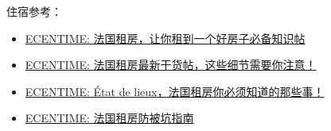 住宿参考：
\begin{itemize}
    \item \href{https://www.ecentime.com/article/location-logement}{ECENTIME: 法国租房，让你租到一个好房子必备知识帖}
    \item \href{https://www.ecentime.com/article/location-en-france}{ECENTIME: 法国租房最新干货帖，这些细节需要你注意！}
    \item \href{https://www.ecentime.com/article/connaissances-sur-etat-des-lieux}{ECENTIME: État de lieux，法国租房你必须知道的那些事！}
    \item \href{https://www.ecentime.com/article/location-en-france-tuto}{ECENTIME: 法国租房防被坑指南}
\end{itemize}

